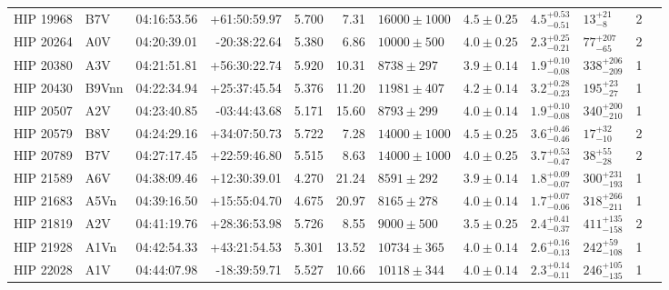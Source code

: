 \begin{tiny}
\begin{longtable}{|l|lrrrrllllll|}
   HIP 19968 &      B7V &    04:16:53.56 &   +61:50:59.97 &   5.700 &      7.31 &  $16000 \pm 1000$ &  $4.5 \pm 0.25$ &  $4.5^{+0.53}_{-0.51}$ &       $13^{+21}_{-8}$ &       2 \\
   HIP 20264 &      A0V &    04:20:39.01 &   -20:38:22.64 &   5.380 &      6.86 &   $10000 \pm 500$ &  $4.0 \pm 0.25$ &  $2.3^{+0.25}_{-0.21}$ &     $77^{+207}_{-65}$ &       2 \\
   HIP 20380 &      A3V &    04:21:51.81 &   +56:30:22.74 &   5.920 &     10.31 &    $8738 \pm 297$ &  $3.9 \pm 0.14$ &  $1.9^{+0.10}_{-0.08}$ &   $338^{+206}_{-209}$ &       1 \\
   HIP 20430 &    B9Vnn &    04:22:34.94 &   +25:37:45.54 &   5.376 &     11.20 &   $11981 \pm 407$ &  $4.2 \pm 0.14$ &  $3.2^{+0.28}_{-0.23}$ &     $195^{+23}_{-27}$ &       1 \\
   HIP 20507 &      A2V &    04:23:40.85 &   -03:44:43.68 &   5.171 &     15.60 &    $8793 \pm 299$ &  $4.0 \pm 0.14$ &  $1.9^{+0.10}_{-0.08}$ &   $340^{+200}_{-210}$ &       1 \\
   HIP 20579 &      B8V &    04:24:29.16 &   +34:07:50.73 &   5.722 &      7.28 &  $14000 \pm 1000$ &  $4.5 \pm 0.25$ &  $3.6^{+0.46}_{-0.46}$ &      $17^{+32}_{-10}$ &       2 \\
   HIP 20789 &      B7V &    04:27:17.45 &   +22:59:46.80 &   5.515 &      8.63 &  $14000 \pm 1000$ &  $4.0 \pm 0.25$ &  $3.7^{+0.53}_{-0.47}$ &      $38^{+55}_{-28}$ &       2 \\
   HIP 21589 &      A6V &    04:38:09.46 &   +12:30:39.01 &   4.270 &     21.24 &    $8591 \pm 292$ &  $3.9 \pm 0.14$ &  $1.8^{+0.09}_{-0.07}$ &   $300^{+231}_{-193}$ &       1 \\
   HIP 21683 &     A5Vn &    04:39:16.50 &   +15:55:04.70 &   4.675 &     20.97 &    $8165 \pm 278$ &  $4.0 \pm 0.14$ &  $1.7^{+0.07}_{-0.06}$ &   $318^{+266}_{-211}$ &       1 \\
   HIP 21819 &      A2V &    04:41:19.76 &   +28:36:53.98 &   5.726 &      8.55 &    $9000 \pm 500$ &  $3.5 \pm 0.25$ &  $2.4^{+0.41}_{-0.37}$ &   $411^{+135}_{-158}$ &       2 \\
   HIP 21928 &     A1Vn &    04:42:54.33 &   +43:21:54.53 &   5.301 &     13.52 &   $10734 \pm 365$ &  $4.0 \pm 0.14$ &  $2.6^{+0.16}_{-0.13}$ &    $242^{+59}_{-108}$ &       1 \\
   HIP 22028 &      A1V &    04:44:07.98 &   -18:39:59.71 &   5.527 &     10.66 &   $10118 \pm 344$ &  $4.0 \pm 0.14$ &  $2.3^{+0.14}_{-0.11}$ &   $246^{+105}_{-135}$ &       1 \\

\end{longtable}
\end{tiny}
